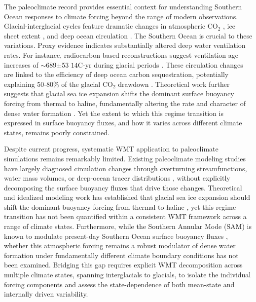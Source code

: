 \documentclass[draft]{agujournal2025}
\begin{document}
The paleoclimate record provides essential context for understanding Southern Ocean responses to climate forcing beyond the range of modern observations. Glacial-interglacial cycles feature dramatic changes in atmospheric CO$_2$ \citep{SigmanBoyle2000,Kohfeld2005}, ice sheet extent \citep{huybrechts1990antarctic}, and deep ocean circulation \citep{orliss1986late,rafter2022global}. The Southern Ocean is crucial to these variations. Proxy evidence indicates substantially altered deep water ventilation rates. For instance, radiocarbon-based reconstructions suggest ventilation age increases of  $\sim$689$\pm$53 ${14}$C-yr during glacial periods \citep{Skinner2017}. These circulation changes are linked to the efficiency of deep ocean carbon sequestration, potentially explaining 50-80\% of the glacial CO$_2$ drawdown \citep{Ferrari2014,Skinner2017}. Theoretical work further suggests that glacial sea ice expansion shifts the dominant surface buoyancy forcing from thermal to haline, fundamentally altering the rate and character of dense water formation \citep{Ferrari2014,Marzocchi2017}. Yet the extent to which this regime transition is expressed in surface buoyancy fluxes, and how it varies across different climate states, remains poorly constrained.

Despite current progress, systematic WMT application to paleoclimate simulations remains remarkably limited.  Existing paleoclimate modeling studies have largely diagnosed circulation changes through overturning streamfunctions, water mass volumes, or deep-ocean tracer distributions \citep{Weber2007,Wainer2012}, without explicitly decomposing the surface buoyancy fluxes that drive those changes. Theoretical and idealized modeling work has established that glacial sea ice expansion should shift the dominant buoyancy forcing from thermal to haline \citep{Ferrari2014,Marzocchi2017}, yet this regime transition has not been quantified within a consistent WMT framework across a range of climate states. Furthermore, while the Southern Annular Mode (SAM) is known to modulate present-day Southern Ocean surface buoyancy fluxes \citep{Sallee2010}, whether this atmospheric forcing remains a robust modulator of dense water formation under fundamentally different climate boundary conditions has not been examined. Bridging this gap requires explicit WMT decomposition across multiple climate states, spanning interglacials to glacials, to isolate the individual forcing components and assess the state-dependence of both mean-state and internally driven variability.
\end{document}
